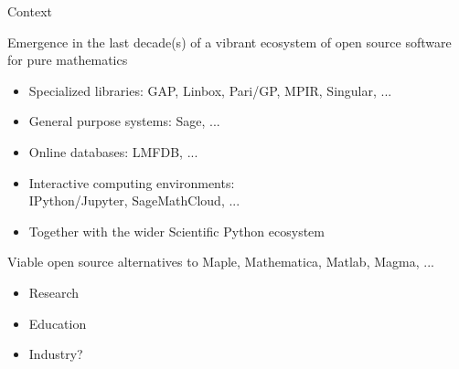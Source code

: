 \documentclass[
  usenames,svgnames, %
  compress,
  ]{beamer}
\begin{document}
\begin{frame}{Context}
  \begin{block}{Emergence in the last decade(s) of a vibrant ecosystem
      of open source software for pure mathematics}

    \begin{itemize}
    \item Specialized libraries: GAP, Linbox, Pari/GP, MPIR, Singular,
      ...
    \item General purpose systems: Sage, ...
    \item Online databases: LMFDB, ...
    \item Interactive computing environments:\\
      IPython/Jupyter, SageMathCloud, ...
    \item Together with the wider Scientific Python ecosystem
    \end{itemize}
  \end{block}
  \pause
  \bigskip

  \begin{block}{Viable open source alternatives to Maple, Mathematica,
      Matlab, Magma, ...}
    \begin{itemize}
    \item Research
    \item Education
    \item Industry?
    \end{itemize}
  \end{block}
\end{frame}
\end{document}
